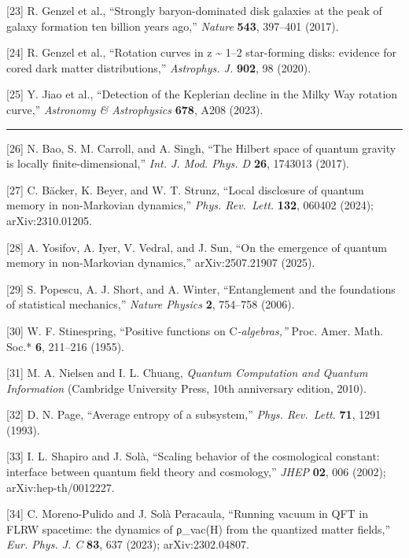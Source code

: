 \documentclass[
]{article}
\begin{document}
{[}23{]} R. Genzel et al., ``Strongly baryon-dominated disk galaxies at
the peak of galaxy formation ten billion years ago,'' \emph{Nature}
\textbf{543}, 397--401 (2017).

{[}24{]} R. Genzel et al., ``Rotation curves in z \textasciitilde{} 1--2
star-forming disks: evidence for cored dark matter distributions,''
\emph{Astrophys. J.} \textbf{902}, 98 (2020).

{[}25{]} Y. Jiao et al., ``Detection of the Keplerian decline in the
Milky Way rotation curve,'' \emph{Astronomy \& Astrophysics}
\textbf{678}, A208 (2023).

\begin{center}\rule{0.5\linewidth}{0.5pt}\end{center}

{[}26{]} N. Bao, S. M. Carroll, and A. Singh, ``The Hilbert space of
quantum gravity is locally finite-dimensional,'' \emph{Int. J. Mod.
Phys. D} \textbf{26}, 1743013 (2017).

{[}27{]} C. Bäcker, K. Beyer, and W. T. Strunz, ``Local disclosure of
quantum memory in non-Markovian dynamics,'' \emph{Phys. Rev.~Lett.}
\textbf{132}, 060402 (2024); arXiv:2310.01205.

{[}28{]} A. Yosifov, A. Iyer, V. Vedral, and J. Sun, ``On the emergence
of quantum memory in non-Markovian dynamics,'' arXiv:2507.21907 (2025).

{[}29{]} S. Popescu, A. J. Short, and A. Winter, ``Entanglement and the
foundations of statistical mechanics,'' \emph{Nature Physics}
\textbf{2}, 754--758 (2006).

{[}30{]} W. F. Stinespring, ``Positive functions on C\emph{-algebras,''
}Proc. Amer. Math. Soc.* \textbf{6}, 211--216 (1955).

{[}31{]} M. A. Nielsen and I. L. Chuang, \emph{Quantum Computation and
Quantum Information} (Cambridge University Press, 10th anniversary
edition, 2010).

{[}32{]} D. N. Page, ``Average entropy of a subsystem,'' \emph{Phys.
Rev.~Lett.} \textbf{71}, 1291 (1993).

{[}33{]} I. L. Shapiro and J. Solà, ``Scaling behavior of the
cosmological constant: interface between quantum field theory and
cosmology,'' \emph{JHEP} \textbf{02}, 006 (2002); arXiv:hep-th/0012227.

{[}34{]} C. Moreno-Pulido and J. Solà Peracaula, ``Running vacuum in QFT
in FLRW spacetime: the dynamics of ρ\_vac(H) from the quantized matter
fields,'' \emph{Eur. Phys. J. C} \textbf{83}, 637 (2023);
arXiv:2302.04807.
\end{document}
